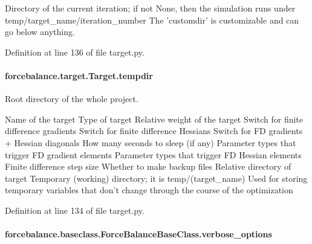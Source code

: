Directory of the current iteration; if not None, then the simulation runs under temp/target\-\_\-name/iteration\-\_\-number The 'customdir' is customizable and can go below anything.

Definition at line 136 of file target.\-py.

\hypertarget{classforcebalance_1_1target_1_1Target_aa1f01b5b78db253b5b66384ed11ed193}{
\paragraph[{tempdir}]{\setlength{\rightskip}{0pt plus 5cm}forcebalance.\-target.\-Target.\-tempdir\hspace{0.3cm}{\ttfamily [inherited]}}}\label{classforcebalance_1_1target_1_1Target_aa1f01b5b78db253b5b66384ed11ed193}


Root directory of the whole project. 

Name of the target Type of target Relative weight of the target Switch for finite difference gradients Switch for finite difference Hessians Switch for F\-D gradients + Hessian diagonals How many seconds to sleep (if any) Parameter types that trigger F\-D gradient elements Parameter types that trigger F\-D Hessian elements Finite difference step size Whether to make backup files Relative directory of target Temporary (working) directory; it is temp/(target\-\_\-name) Used for storing temporary variables that don't change through the course of the optimization 

Definition at line 134 of file target.\-py.

\hypertarget{classforcebalance_1_1baseclass_1_1ForceBalanceBaseClass_a8088e1e20cbd6bc175fb9c9fe9fa0f18}{
\paragraph[{verbose\-\_\-options}]{\setlength{\rightskip}{0pt plus 5cm}forcebalance.\-baseclass.\-Force\-Balance\-Base\-Class.\-verbose\-\_\-options\hspace{0.3cm}{\ttfamily [inherited]}}}\label{classforcebalance_1_1baseclass_1_1ForceBalanceBaseClass_a8088e1e20cbd6bc175fb9c9fe9fa0f18}


